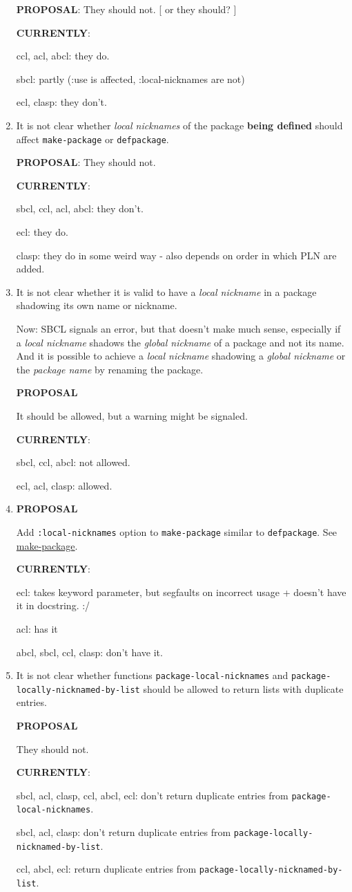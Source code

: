 \documentclass[11pt]{article}
\begin{document}
\begin{enumerate}
\textbf{PROPOSAL}:
They should not.  [ or they should? ]

\textbf{CURRENTLY}:

ccl, acl, abcl: they do.

sbcl: partly (:use is affected, :local-nicknames are not)

ecl, clasp: they don't.

\item It is not clear whether \emph{local nicknames} of the package \textbf{being defined}
should affect \texttt{make-package} or \texttt{defpackage}.

\textbf{PROPOSAL}:
They should not.

\textbf{CURRENTLY}:

sbcl, ccl, acl, abcl: they don't.

ecl: they do.

clasp: they do in some weird way - also depends on order in which PLN are
added.

\item It is not clear whether it is valid to have a \emph{local nickname} in a package
shadowing its own name or nickname.

Now: SBCL signals an error, but that doesn't make much sense, especially if
a \emph{local nickname} shadows the \emph{global nickname} of a package and not its
name. And it is possible to achieve a \emph{local nickname} shadowing a \emph{global
nickname} or the \emph{package name} by renaming the package.

\textbf{PROPOSAL}

It should be allowed, but a warning might be signaled.

\textbf{CURRENTLY}:

sbcl, ccl, abcl: not allowed.

ecl, acl, clasp: allowed.
\item \textbf{PROPOSAL}

Add \texttt{:local-nicknames} option to \texttt{make-package} similar to \texttt{defpackage}.
See \hyperref[sec:org650726f]{make-package}.

\textbf{CURRENTLY}:

ecl: takes keyword parameter, but segfaults on incorrect usage + doesn't
have it in docstring. :/

acl: has it

abcl, sbcl, ccl, clasp: don't have it.
\item It is not clear whether functions \texttt{package-local-nicknames} and
\texttt{package-locally-nicknamed-by-list} should be allowed to return
lists with duplicate entries.

\textbf{PROPOSAL}

They should not.

\textbf{CURRENTLY}:

sbcl, acl, clasp, ccl, abcl, ecl: don't return duplicate entries from \texttt{package-local-nicknames}.

sbcl, acl, clasp: don't return duplicate entries from \texttt{package-locally-nicknamed-by-list}.

ccl, abcl, ecl: return duplicate entries from \texttt{package-locally-nicknamed-by-list}.
\end{enumerate}
\end{document}
